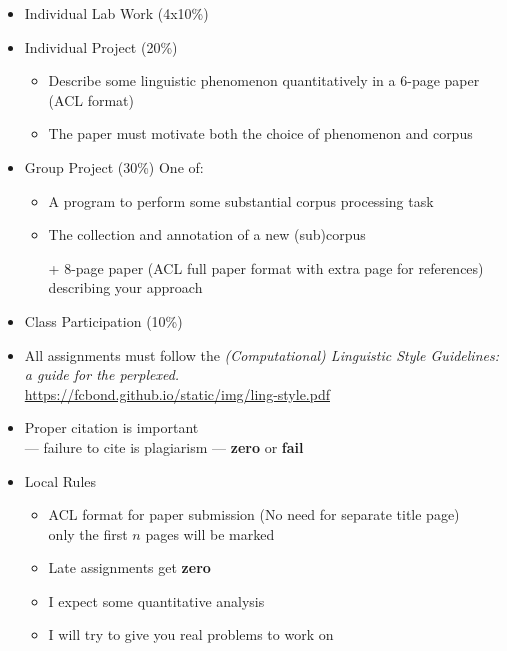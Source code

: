 \documentclass[a4paper,landscape,headrule,footrule,xetex]{foils}
\begin{document}


\begin{itemize}
\item Individual Lab Work (4x10\%)
\item Individual Project (20\%) 
  \begin{itemize}
  \item  Describe some linguistic phenomenon quantitatively in a 6-page paper (ACL format)
  \item The paper must motivate both the choice of phenomenon and corpus
  \end{itemize}
\item Group Project (30\%) One of:
  \begin{itemize}
  \item A program to perform some substantial corpus processing task
  \item The collection and annotation of a new (sub)corpus
  \item[+]     8-page paper (ACL full paper format with extra page for references) describing your approach
  \end{itemize}
\item Class Participation  (10\%)
\end{itemize}



\begin{itemize}
\item All assignments must follow the \textit{(Computational)
    Linguistic Style Guidelines: a guide for the perplexed. } \\
  \url{https://fcbond.github.io/static/img/ling-style.pdf}
\item Proper citation is important 
    \\ --- failure to cite is plagiarism --- \textbf{zero} or \textbf{fail}
\item Local Rules
  \begin{itemize}
  \item ACL format for paper submission (No need for separate title page)
    \\ only the first $n$ pages will be marked
  \item Late assignments get \textbf{zero}
  \item I expect some quantitative analysis
  \item I will try to give you real problems to work on
  \end{itemize}
\end{itemize}
\end{document}
